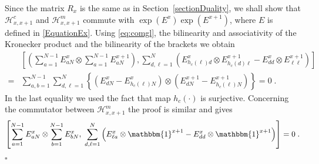 \documentclass[10pt]{article}
\numberwithin{equation}{section}
\numberwithin{equation}{subsection}
\newcommand{\dt}{\;.}
\begin{document}
Since the matrix $R_{x}$ is the same as in Section~\ref{sectionDuality}, we shall show that $\mathcal{H}_{x,x+1}^{c}$ and $\mathcal{H}_{x,x+1}^{m}$ commute with $\exp{(E^{x})}\exp{(E^{x+1})}$, where $E$ is defined in \eqref{EquationEx}. Using \eqref{eq:comgl}, the bilinearity and associativity of the Kronecker product and the bilinearity of the brackets we obtain 
\begin{align*}
	&\left[\left(\sum_{a=1}^{N-1}E_{aN}^{x}\otimes\sum_{a=1}^{N-1}E_{aN}^{x+1}\right), \sum_{d,\ell=1}^{N}\left(E_{h_{c}(\ell)d}^{x}\otimes E_{h_{c}(d)\ell}^{x+1} -E_{dd}^{x}\otimes E_{\ell\ell}^{x+1}\right)\right]
	\\=&
	\sum_{a,b=1}^{N-1}\sum_{d,\ell=1}^{N}\left\{\left(E_{dN}^{x}-E_{h_{c}(\ell)N}^{x}\right)\otimes \left(E_{dN}^{x+1}-E_{h_{c}(\ell)N}^{x+1}\right)\right\}=0\dt
\end{align*}
In the last equality we used the fact that map $h_{c}(\cdot)$ is surjective. 
Concerning the commutator between $\mathcal{H}_{x,x+1}^{m}$ the proof is similar and gives
\begin{equation}
	\left[\sum_{a=1}^{N-1}E_{aN}^{x}\otimes \sum_{b=1}^{N-1}E_{bN}^{x},\;\sum_{d,\ell=1}^{N}\left(E_{\ell a}^{x}\otimes \mathbbm{1}^{x+1}-E_{dd}^{x}\otimes \mathbbm{1}^{x+1}\right)\right]=0\dt
\end{equation}
\begin{flushright}
	$\square$
\end{flushright}
\end{document}
